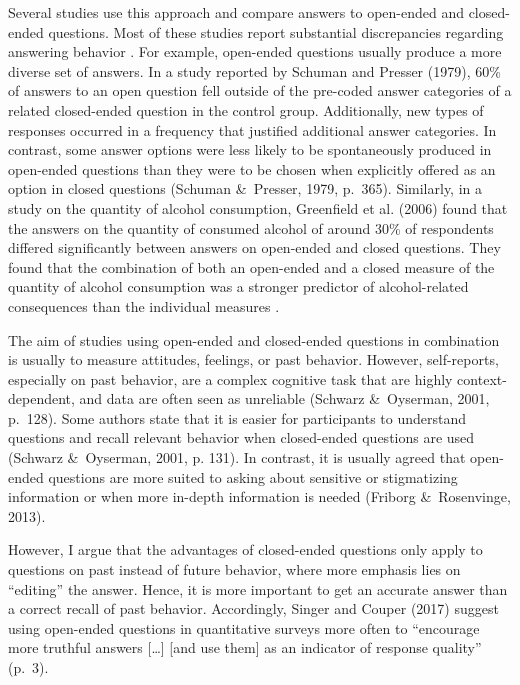 \documentclass{article}
\begin{document}
Several studies use this approach and compare answers to open-ended and closed-ended questions. Most of these studies report substantial discrepancies regarding answering behavior \parencite{Converse1984, Greenfield2006, Schuman1979, Schwarz1999}. For example, open-ended questions usually produce a more diverse set of answers. In a study reported by Schuman and Presser (1979), 60\% of answers to an open question fell outside of the pre-coded answer categories of a related closed-ended question in the control group. Additionally, new types of responses occurred in a frequency that justified additional answer categories. In contrast, some answer options were less likely to be spontaneously produced in open-ended questions than they were to be chosen when explicitly offered as an option in closed questions (Schuman \& Presser, 1979, p. 365). Similarly, in a study on the quantity of alcohol consumption, Greenfield et al. (2006) found that the answers on the quantity of consumed alcohol of around 30\% of respondents differed significantly between answers on open-ended and closed questions. They found that the combination of both an open-ended and a closed measure of the quantity of alcohol consumption was a stronger predictor of alcohol-related consequences than the individual measures \parencite{Greenfield2006}.

The aim of studies using open-ended and closed-ended questions in combination is usually to measure attitudes, feelings, or past behavior. However, self-reports, especially on past behavior, are a complex cognitive task that are highly context-dependent, and data are often seen as unreliable (Schwarz \& Oyserman, 2001, p. 128). Some authors state that it is easier for participants to understand questions and recall relevant behavior when closed-ended questions are used (Schwarz \& Oyserman, 2001, p. 131). In contrast, it is usually agreed that open-ended questions are more suited to asking about sensitive or stigmatizing information or when more in-depth information is needed (Friborg \& Rosenvinge, 2013).

However, I argue that the advantages of closed-ended questions only apply to questions on past instead of future behavior, where more emphasis lies on “editing” the answer. Hence, it is more important to get an accurate answer than a correct recall of past behavior. Accordingly, Singer and Couper (2017) suggest using open-ended questions in quantitative surveys more often to “encourage more truthful answers […] [and use them] as an indicator of response quality” (p. 3).
\end{document}

